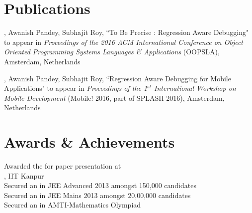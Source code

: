 \documentclass[mm]{simple_style}
\begin{document}
\begin{resume}
\section{Publications}
, Awanish Pandey, Subhajit Roy, ``To Be Precise : Regression Aware Debugging" to appear in \textit{Proceedings of the 2016 ACM International Conference on Object Oriented Programming Systems Languages \& Applications} (OOPSLA), Amsterdam, Netherlands

, Awanish Pandey, Subhajit Roy, ``Regression Aware Debugging for Mobile Applications" to appear in \textit{Proceedings of the 1$^{st}$ International Workshop on Mobile Development} (Mobile! 2016, part of SPLASH 2016), Amsterdam, Netherlands

\vspace{-2ex}
\sectionline
\section{Awards \& Achievements}
Awarded the  for paper presentation at \\
, IIT Kanpur\\
Secured an  in JEE Advanced 2013 amongst 150,000 candidates\\
Secured an  in JEE Mains 2013 amongst 20,00,000 candidates\\
Secured an  in AMTI-Mathematics Olympiad

\vspace{-2ex}
\sectionline


\end{resume}
\end{document}
